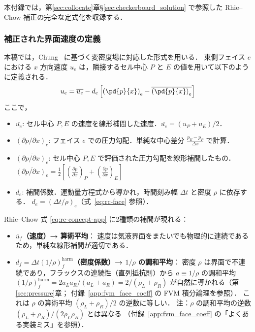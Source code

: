 本付録では，第\ref{sec:collocate}章§\ref{sec:checkerboard_solution} で参照した
Rhie--Chow 補正の完全な定式化を収録する．

\subsubsection{補正された界面速度の定義}
本稿では，Chung~\cite{Chung2002} に基づく変密度場に対応した形式を用いる．
東側フェイス $e$ における $x$ 方向速度 $u_e$ は，隣接するセル中心 $P$ と $E$ の値を用いて以下のように定義される．
\begin{equation}
 u_e = \overline{u_e} - d_e \left[ \left(\pd{p}{x}\right)_e - \overline{\left(\pd{p}{x}\right)_e} \right]
 \label{eq:rc-concept-app}
\end{equation}
ここで，
\begin{itemize}
    \item $\overline{u_e}$: セル中心 $P, E$ の速度を線形補間した速度．$\overline{u_e} = (u_P+u_E)/2$．
    \item $(\partial p/\partial x)_e$: フェイス $e$ での圧力勾配．単純な中心差分 $\frac{p_E-p_P}{\Delta x}$ で計算．
    \item $\overline{(\partial p/\partial x)_e}$: セル中心 $P, E$ で評価された圧力勾配を線形補間したもの．
    $\overline{(\partial p/\partial x)_e} = \frac{1}{2}\left[ \left(\frac{\partial p}{\partial x}\right)_P + \left(\frac{\partial p}{\partial x}\right)_E \right]$
    \item $d_e$: 補間係数．運動量方程式から導かれ，時間刻み幅 $\Delta t$ と密度 $\rho$ に依存する．
    $d_e = (\Delta t / \rho)_e$（式~\eqref{eq:rc-face} 参照）．
\end{itemize}

Rhie--Chow 式 \eqref{eq:rc-concept-app} に2種類の補間が現れる：
\begin{itemize}
  \item \textbf{$\bar{u}_f$（速度）→ 算術平均}：
    速度は気液界面をまたいでも物理的に連続であるため，単純な線形補間が適切である．
  \item \textbf{$d_f = \Delta t (1/\rho)_f^{\mathrm{harm}}$（密度係数）→ $1/\rho$ の調和平均}：
    密度 $\rho$ は界面で不連続であり，フラックスの連続性（直列抵抗則）から
    $a \equiv 1/\rho$ の調和平均
    $(1/\rho)_f^{\mathrm{harm}} = 2a_La_R/(a_L+a_R) = 2/(\rho_L+\rho_R)$
    が自然に導かれる（第\ref{sec:pressure}章；
    付録~\ref{app:fvm_face_coeff} の FVM 積分論理を参照）．
    これは $\rho$ の算術平均 $(\rho_L+\rho_R)/2$ の逆数に等しい．
    注：$\rho$ の調和平均の逆数 $(\rho_L+\rho_R)/(2\rho_L\rho_R)$ とは異なる
    （付録~\ref{app:fvm_face_coeff} の「よくある実装ミス」を参照）．
\end{itemize}

